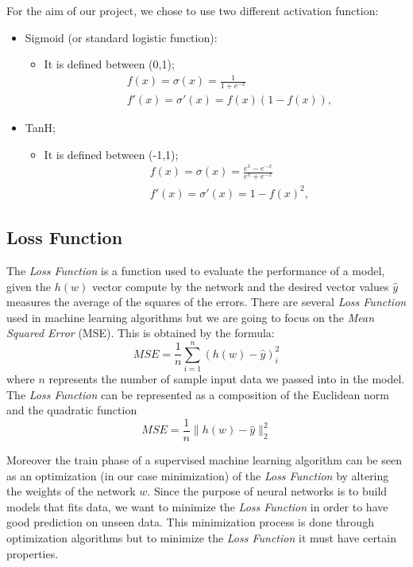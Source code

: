 For the aim of our project, we chose to use two different activation function:
\begin{itemize}
	\label{sigmoid}
	\item Sigmoid (or standard logistic function):
	\begin{itemize}
		\item It is defined between (0,1); 		
			\begin{align*}
			&f(x) = \sigma(x) = \frac{1}{1 + e^{-x}} \\
			&f'(x) = \sigma'(x) = f(x)(1 - f(x)),
			\end{align*} 
	\end{itemize}
	\item TanH;
	\label{tanH}
	\begin{itemize}
		\item It is defined between (-1,1); 		
		\begin{align*}
		&f(x) = \sigma(x) = \frac{e^{x}-e^{-x}}{e^{x} + e^{-x}} \\
		&f'(x) = \sigma'(x) = 1 - f(x)^{2},
		\end{align*} 
	\end{itemize}
\end{itemize}
\subsection{Loss Function}
\label{Loss:Mse}
The \textit{Loss Function} is a function used to evaluate the performance of a model, given the $h(w)$ vector compute by the network and the desired vector values $\widehat{y}$ measures the average of the squares of the errors. There are several \textit{Loss Function} used in machine learning algorithms but we are going to focus on the \textit{Mean Squared Error} (MSE). This is obtained by the formula: 	
\begin{equation}
MSE = \frac{1}{n} \sum_{i=1}^n (h(w) - \widehat{y})_{i}^2
\end{equation}
where $n$ represents the number of sample input data we passed into in the model. 
The \textit{Loss Function} can be represented as a composition of the Euclidean norm and the quadratic function
\begin{equation}
MSE = \frac{1}{n} \parallel h(w) - \widehat{y} \parallel_{2}^2  
\end{equation}

Moreover the train phase of a supervised machine learning algorithm can be seen as an optimization (in our case minimization) of the \textit{Loss Function} by altering the weights of the network $w$.   
Since the purpose of neural networks is to build models that fits data, we want to minimize the \textit{Loss Function} in order to have good prediction on unseen data. This minimization process is done through optimization algorithms but to minimize the \textit{Loss Function} it must have certain properties.	

